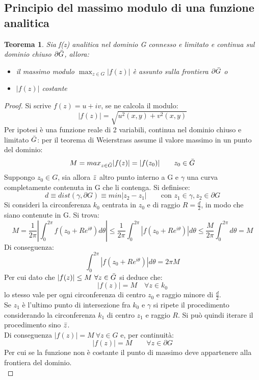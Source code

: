 \documentclass[twoside]{article}
\newtheorem{theorem}{Teorema}[section]
\begin{document}
\subsection{Principio del massimo modulo di una funzione analitica}\label{massimo modulo}
\begin{theorem}
Sia f(z) analitica nel dominio G connesso e limitato e continua sul dominio chiuso $\partial \Bar{G}$, allora:
\begin{itemize}
    \item il massimo modulo $\max_{z\in G}|f(z)|$ è assunto sulla frontiera $\partial \Bar{G}$ o
    \item $|f(z)|$ costante
\end{itemize}
\end{theorem}
\begin{proof}
Si scrive $f(z)=u+iv$, se ne calcola il modulo:
\begin{equation}
    |f(z)|=\sqrt{u^2(x,y)+v^2(x,y)}
\end{equation}
Per ipotesi è una funzione reale di 2 variabili, continua nel dominio chiuso e limitato $\Bar{G}$: per il teorema di Weierstrass assume il valore massimo in un punto del dominio:
\begin{equation}
    M=max_{z \in \Bar{G}}|f(z)|=|f(z_0)| \qquad z_0\in \Bar{G}
\end{equation}
Suppongo $z_0\in G$, sia allora $\Bar{z}$ altro punto interno a G e $\gamma$ una curva completamente contenuta in G che li contenga. Si definisce:
\begin{equation}
    d\equiv dist(\gamma,\partial G)\equiv min|z_2-z_1| \qquad \text{con } z_1\in\gamma, z_2\in\partial G
\end{equation}
Si consideri la circonferenza $k_0$ centrata in $z_0$ e di raggio $R=\frac{d}{2}$, in modo che siano contenute in G. Si trova:
\begin{equation}
    M=\frac{1}{2\pi}\left|\int_0^{2\pi}f(z_0+Re^{i\theta})d\theta\right|\le\frac{1}{2\pi}\int_0^{2\pi}\left|f(z_0+Re^{i\theta})\right|d\theta\le \frac{M}{2\pi}\int_0^{2\pi}d\theta=M
\end{equation}
Di conseguenza:
\begin{equation}
    \int_0^{2\pi}\left|f(z_0+Re^{i\theta})\right|d\theta=2\pi M
\end{equation}
Per cui dato che $|f(z)|\le M\ \forall z \in \Bar{G}$ si deduce che:
\begin{equation}
    |f(z)|=M \quad \forall z\in k_0
\end{equation}
lo stesso vale per ogni circonferenza di centro $z_0$ e raggio minore di $\frac{d}{2}$.\\
Se $z_1$ è l'ultimo punto di intersezione fra $k_0$ e $\gamma$ si ripete il procedimento considerando la circonferenza $k_1$ di centro $z_1$ e raggio $R$. Si può quindi iterare il procedimento sino $\Bar{z}$.\\
Di conseguenza $|f(z)|=M\  \forall z \in G$ e, per continuità:
\begin{equation}
    |f(z)|=M \qquad \forall z \in \partial G
\end{equation}
Per cui se la funzione non è costante il punto di massimo deve appartenere alla frontiera del dominio.\\
\end{proof} 
\end{document}

